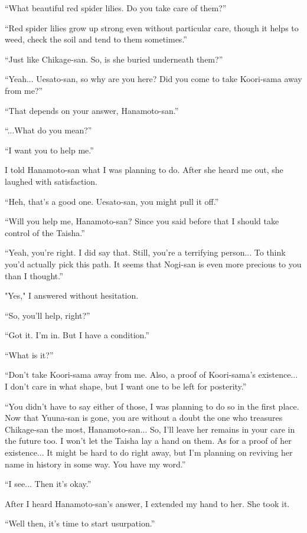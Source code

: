 ``What beautiful red spider lilies. Do you take care of them?''

``Red spider lilies grow up strong even without particular care, though it helps to weed, check the soil and tend to them sometimes.''

``Just like Chikage-san. So, is she buried underneath them?''

``Yeah... Uesato-san, so why are you here? Did you come to take Koori-sama away from me?''

``That depends on your answer, Hanamoto-san.''

``...What do you mean?''

``I want you to help me.''

I told Hanamoto-san what I was planning to do. After she heard me out, she laughed with satisfaction.

``Heh, that's a good one. Uesato-san, you might pull it off.''

``Will you help me, Hanamoto-san? Since you said before that I should take control of the Taisha.''

``Yeah, you're right. I did say that. Still, you're a terrifying person... To think you'd actually pick this path. It seems that Nogi-san is even more precious to you than I thought.''

"Yes," I answered without hesitation.

``So, you'll help, right?''

``Got it. I'm in. But I have a condition.''

``What is it?''

``Don't take Koori-sama away from me. Also, a proof of Koori-sama's existence... I don't care in what shape, but I want one to be left for posterity.''

``You didn't have to say either of those, I was planning to do so in the first place. Now that Yuuna-san is gone, you are without a doubt the one who treasures Chikage-san the most, Hanamoto-san... So, I'll leave her remains in your care in the future too. I won't let the Taisha lay a hand on them. As for a proof of her existence... It might be hard to do right away, but I'm planning on reviving her name in history in some way. You have my word.''

``I see... Then it's okay.''

After I heard Hanamoto-san's answer, I extended my hand to her. She took it.

``Well then, it's time to start usurpation.''

